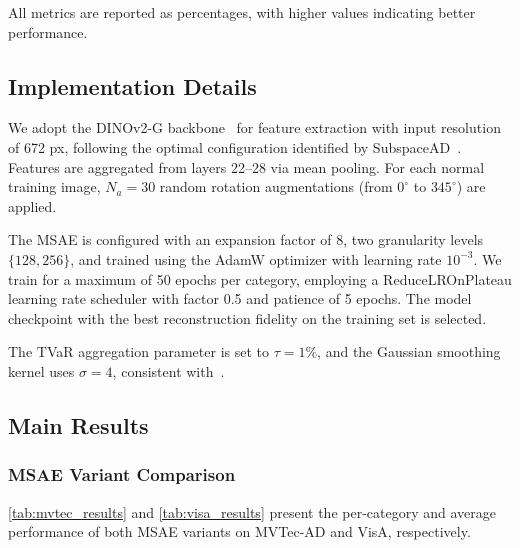 All metrics are reported as percentages, with higher values indicating better performance.

\subsection{Implementation Details}

We adopt the DINOv2-G backbone~\cite{Oquab2023DINOv2} for feature extraction with input resolution of 672 px, following the optimal configuration identified by SubspaceAD~\cite{Lendering2025SubspaceAD}.
Features are aggregated from layers 22--28 via mean pooling.
For each normal training image, $N_a = 30$ random rotation augmentations (from $0^\circ$ to $345^\circ$) are applied.

The MSAE is configured with an expansion factor of 8, two granularity levels $\{128, 256\}$, and trained using the AdamW optimizer with learning rate $10^{-3}$.
We train for a maximum of 50 epochs per category, employing a ReduceLROnPlateau learning rate scheduler with factor 0.5 and patience of 5 epochs.
The model checkpoint with the best reconstruction fidelity on the training set is selected.

The TVaR aggregation parameter is set to $\tau = 1\%$, and the Gaussian smoothing kernel uses $\sigma = 4$, consistent with~\cite{Lendering2025SubspaceAD}.

\subsection{Main Results}

\subsubsection{MSAE Variant Comparison}

\cref{tab:mvtec_results} and \cref{tab:visa_results} present the per-category and average performance of both MSAE variants on MVTec-AD and VisA, respectively.

